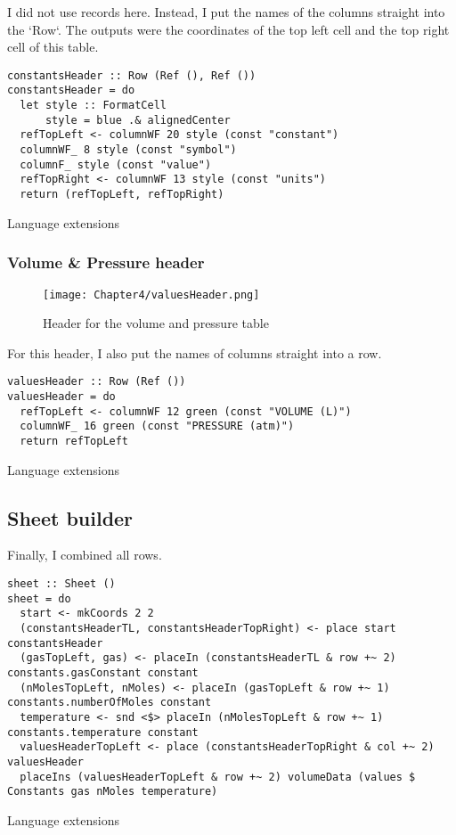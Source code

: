 I did not use records here. Instead, I put the names of the columns straight into the `Row`. The outputs were the coordinates of the top left cell and the top right cell of this table.

\begin{listing}[!h]
  \begin{verbatim}
constantsHeader :: Row (Ref (), Ref ())
constantsHeader = do
  let style :: FormatCell
      style = blue .& alignedCenter
  refTopLeft <- columnWF 20 style (const "constant")
  columnWF_ 8 style (const "symbol")
  columnF_ style (const "value")
  refTopRight <- columnWF 13 style (const "units")
  return (refTopLeft, refTopRight)
\end{verbatim}
\caption{Language extensions}
\label{example3:extensions}
\end{listing}

\subsubsection{Volume \& Pressure header}

\begin{figure}[h]
  \centering
  \texttt{[image: Chapter4/valuesHeader.png]}
  \caption{Header for the volume and pressure table}
  \label{fig:valuesHeader}
\end{figure}

For this header, I also put the names of columns straight into a row.

\begin{listing}[!h]
  \begin{verbatim}
valuesHeader :: Row (Ref ())
valuesHeader = do
  refTopLeft <- columnWF 12 green (const "VOLUME (L)")
  columnWF_ 16 green (const "PRESSURE (atm)")
  return refTopLeft
\end{verbatim}
\caption{Language extensions}
\label{example3:extensions}
\end{listing}

\subsection{Sheet builder}

Finally, I combined all rows.

\begin{listing}[!h]
  \begin{verbatim}
sheet :: Sheet ()
sheet = do
  start <- mkCoords 2 2
  (constantsHeaderTL, constantsHeaderTopRight) <- place start constantsHeader
  (gasTopLeft, gas) <- placeIn (constantsHeaderTL & row +~ 2) constants.gasConstant constant
  (nMolesTopLeft, nMoles) <- placeIn (gasTopLeft & row +~ 1) constants.numberOfMoles constant
  temperature <- snd <$> placeIn (nMolesTopLeft & row +~ 1) constants.temperature constant
  valuesHeaderTopLeft <- place (constantsHeaderTopRight & col +~ 2) valuesHeader
  placeIns (valuesHeaderTopLeft & row +~ 2) volumeData (values $ Constants gas nMoles temperature)
\end{verbatim}
\caption{Language extensions}
\label{example3:extensions}
\end{listing}

